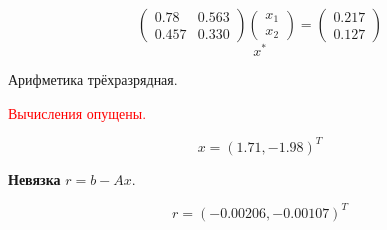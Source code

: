 \[\begin{pmatrix}
        0.78  & 0.563 \\
        0.457 & 0.330
    \end{pmatrix}
    \begin{pmatrix}
        x_1 \\
        x_2
    \end{pmatrix} =
    \begin{pmatrix}
        0.217 \\
        0.127
    \end{pmatrix} \]
\[x^* \]

Арифметика трёхразрядная.

\textcolor{red}{Вычисления опущены.}

\[x = (1.71, - 1.98)^T\]

\begin{definition}
    \textbf{Невязка} \(r = b - Ax\).
\end{definition}
\[r = ( - 0.00206, - 0.00107)^T\]

\unfinished
